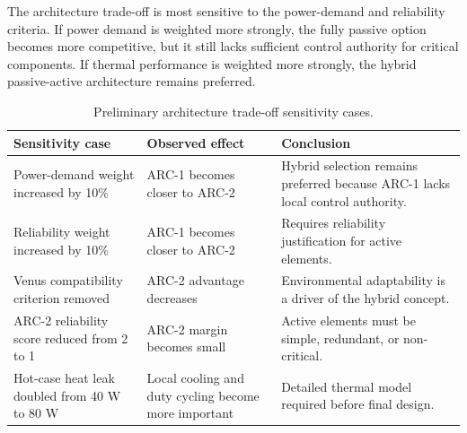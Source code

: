 The architecture trade-off is most sensitive to the power-demand and reliability criteria. If power demand is weighted more strongly, the fully passive option becomes more competitive, but it still lacks sufficient control authority for critical components. If thermal performance is weighted more strongly, the hybrid passive-active architecture remains preferred.

\begin{table}[H]
\centering
\caption{Preliminary architecture trade-off sensitivity cases.}
\label{tab:tcs_sensitivity_cases}
\begin{tabular}{|p{4.2cm}|p{4.0cm}|p{5.0cm}|}
\hline
\textbf{Sensitivity case} & \textbf{Observed effect} & \textbf{Conclusion} \\
\hline
Power-demand weight increased by 10\% & ARC-1 becomes closer to ARC-2 & Hybrid selection remains preferred because ARC-1 lacks local control authority. \\
\hline
Reliability weight increased by 10\% & ARC-1 becomes closer to ARC-2 & Requires reliability justification for active elements. \\
\hline
Venus compatibility criterion removed & ARC-2 advantage decreases & Environmental adaptability is a driver of the hybrid concept. \\
\hline
ARC-2 reliability score reduced from 2 to 1 & ARC-2 margin becomes small & Active elements must be simple, redundant, or non-critical. \\
\hline
Hot-case heat leak doubled from 40 W to 80 W & Local cooling and duty cycling become more important & Detailed thermal model required before final design. \\
\hline
\end{tabular}
\end{table}



